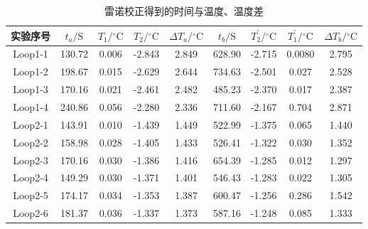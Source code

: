 \documentclass[cn,hazy,pku,12pt,normal,math=newtx,cite=super]{elegantnote}
\begin{document}
\begin{table}[htbp]
    \centering
    \caption{雷诺校正得到的时间与温度、温度差}
    \begin{tabular}{ccccccccc}
        \toprule
        实验序号 & $t_a/\mathrm{S}$ & $T_1/\mathrm{{}^\circ C}$ & $T_2/\mathrm{{}^\circ C}$ & $\Delta T_a/\mathrm{{}^\circ C}$ & $t_b/\mathrm{S}$ & $T_2^\prime/\mathrm{{}^\circ C}$ & $T_1^\prime/\mathrm{{}^\circ C}$ & $\Delta T_b/\mathrm{{}^\circ C}$ \\
        \midrule
        Loop1-1 & 130.72 & 0.006 & -2.843  & 2.849 & 628.90 & -2.715 & 0.0080 & 2.795 \\
        Loop1-2 & 198.67 & 0.015 & -2.629  & 2.644 & 734.63 & -2.501 & 0.027 & 2.528 \\
        Loop1-3 & 170.16 & 0.021 & -2.461  & 2.482 & 485.23 & -2.370 & 0.017 & 2.387 \\
        Loop1-4 & 240.86 & 0.056 & -2.280  & 2.336 & 711.60 & -2.167 & 0.704 & 2.871 \\
        \midrule
        Loop2-1 & 143.91 & 0.010 & -1.439  & 1.449 & 522.99 & -1.375 & 0.065 & 1.440 \\
        Loop2-2 & 158.98 & 0.028 & -1.405  & 1.433 & 526.41 & -1.322 & 0.030 & 1.352 \\
        Loop2-3 & 170.16 & 0.030 & -1.386  & 1.416 & 654.39 & -1.285 & 0.012 & 1.297 \\
        Loop2-4 & 149.29 & 0.030 & -1.371  & 1.401 & 546.43 & -1.283 & 0.022 & 1.305 \\
        Loop2-5 & 174.17 & 0.034 & -1.353  & 1.387 & 600.47 & -1.256 & 0.286 & 1.542 \\
        Loop2-6 & 181.37 & 0.036 & -1.337  & 1.373 & 587.16 & -1.248 & 0.085 & 1.333 \\
        \bottomrule
    \end{tabular}
    \label{tab:3}
\end{table}
\end{document}
